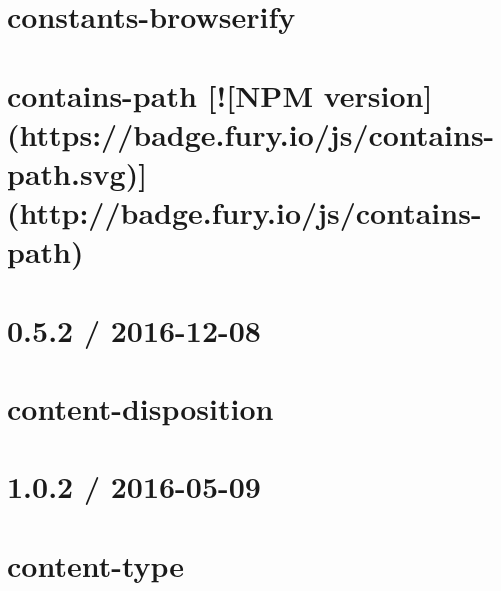 \documentclass[twoside]{book}
\newcommand{\+}{\discretionary{\mbox{\scriptsize$\hookleftarrow$}}{}{}}
\begin{document}
\chapter{constants-\/browserify}
\label{md__c_1_workspace_demo_src_main_script_node_modules_constants-browserify__r_e_a_d_m_e}

\chapter{contains-\/path \mbox{[}!\mbox{[}N\+PM version\mbox{]}(https\+://badge.fury.\+io/js/contains-\/path.svg)\mbox{]}(http\+://badge.fury.\+io/js/contains-\/path)}
\label{md__c_1_workspace_demo_src_main_script_node_modules_contains-path__r_e_a_d_m_e}

\chapter{0.5.2 / 2016-\/12-\/08}
\label{md__c_1_workspace_demo_src_main_script_node_modules_content-disposition__h_i_s_t_o_r_y}

\chapter{content-\/disposition}
\label{md__c_1_workspace_demo_src_main_script_node_modules_content-disposition__r_e_a_d_m_e}

\chapter{1.0.2 / 2016-\/05-\/09}
\label{md__c_1_workspace_demo_src_main_script_node_modules_content-type__h_i_s_t_o_r_y}

\chapter{content-\/type}
\label{md__c_1_workspace_demo_src_main_script_node_modules_content-type__r_e_a_d_m_e}

\end{document}
